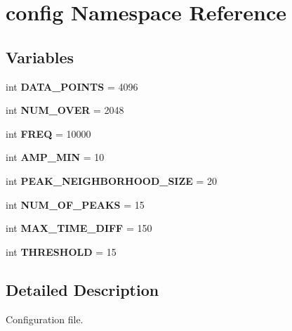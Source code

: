 \hypertarget{namespaceconfig}{\section{config Namespace Reference}
\label{namespaceconfig}
}
\subsection*{Variables}
\begin{DoxyCompactItemize}
\item 
\hypertarget{namespaceconfig_adf75b22e01949f33f4a8e3a3741c61d6}{int {\bfseries D\-A\-T\-A\-\_\-\-P\-O\-I\-N\-T\-S} = 4096}\label{namespaceconfig_adf75b22e01949f33f4a8e3a3741c61d6}

\item 
\hypertarget{namespaceconfig_a6ba0dac65a9edc15d94caac768b977e0}{int {\bfseries N\-U\-M\-\_\-\-O\-V\-E\-R} = 2048}\label{namespaceconfig_a6ba0dac65a9edc15d94caac768b977e0}

\item 
\hypertarget{namespaceconfig_a87d9f28dba7fea8e6bbd5cc76704bf35}{int {\bfseries F\-R\-E\-Q} = 10000}\label{namespaceconfig_a87d9f28dba7fea8e6bbd5cc76704bf35}

\item 
\hypertarget{namespaceconfig_a8562c3d9b5fab74b94cf2df40a6c0f92}{int {\bfseries A\-M\-P\-\_\-\-M\-I\-N} = 10}\label{namespaceconfig_a8562c3d9b5fab74b94cf2df40a6c0f92}

\item 
\hypertarget{namespaceconfig_ae530affe4a1630cbdad9c1b8908b92e3}{int {\bfseries P\-E\-A\-K\-\_\-\-N\-E\-I\-G\-H\-B\-O\-R\-H\-O\-O\-D\-\_\-\-S\-I\-Z\-E} = 20}\label{namespaceconfig_ae530affe4a1630cbdad9c1b8908b92e3}

\item 
\hypertarget{namespaceconfig_a8ffaade7b10824676f14907630783969}{int {\bfseries N\-U\-M\-\_\-\-O\-F\-\_\-\-P\-E\-A\-K\-S} = 15}\label{namespaceconfig_a8ffaade7b10824676f14907630783969}

\item 
\hypertarget{namespaceconfig_a22da15753bd2f0b0b771116ea6ac6cc2}{int {\bfseries M\-A\-X\-\_\-\-T\-I\-M\-E\-\_\-\-D\-I\-F\-F} = 150}\label{namespaceconfig_a22da15753bd2f0b0b771116ea6ac6cc2}

\item 
\hypertarget{namespaceconfig_a3f3fb32c4e7458d657fa14c57f9de639}{int {\bfseries T\-H\-R\-E\-S\-H\-O\-L\-D} = 15}\label{namespaceconfig_a3f3fb32c4e7458d657fa14c57f9de639}

\end{DoxyCompactItemize}


\subsection{Detailed Description}
\begin{DoxyVerb}    Configuration file.
\end{DoxyVerb}
 